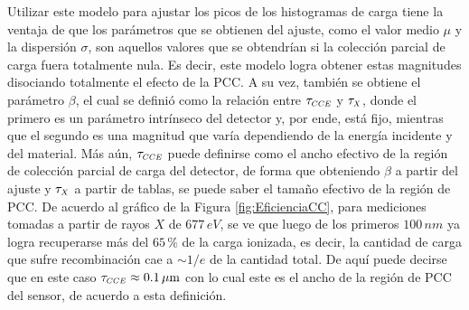 \noindent Utilizar este modelo para ajustar los picos de los histogramas de carga tiene la ventaja de que los parámetros que se obtienen del ajuste, como el valor medio $\mu$ y la dispersión $\sigma$, son aquellos valores que se obtendrían si la colección parcial de carga fuera totalmente nula. Es decir, este modelo logra obtener estas magnitudes disociando totalmente el efecto de la PCC. A su vez, también se obtiene el parámetro $\beta$, el cual se definió como la relación entre $\tau_{\scaleto{CCE}{4pt}}$ y $\tau_{\scaleto{X}{4pt}}$, donde el primero es un parámetro intrínseco del detector y, por ende, está fijo, mientras que el segundo es una magnitud que varía dependiendo de la energía incidente y del material. 
Más aún, $\tau_{\scaleto{CCE}{4pt}}$ puede definirse como el ancho efectivo de la región de colección parcial de carga del detector, de forma que obteniendo $\beta$ a partir del ajuste y $\tau_{\scaleto{X}{4pt}}$ a partir de tablas, se puede saber el tamaño efectivo de la región de PCC. De acuerdo al gráfico de la Figura \ref{fig:EficienciaCC}, para mediciones tomadas a partir de rayos $X$ de $677\,\si{eV}$, se ve que luego de los primeros $100\,\si{nm}$ ya logra recuperarse más del $65\,\%$ de la carga ionizada, es decir, la cantidad de carga que sufre recombinación cae a $\sim 1/e$ de la cantidad total. De aquí puede decirse que en este caso $\tau_{\scaleto{CCE}{4pt}} \approx 0.1\,\si{\mu m}$ con lo cual este es el ancho de la región de PCC del sensor, de acuerdo a esta definición.

